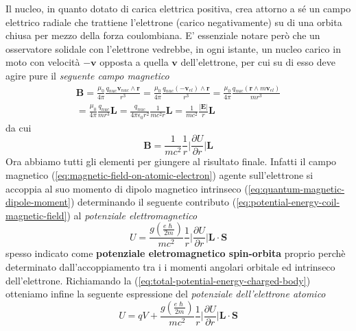 Il nucleo, in quanto dotato di carica elettrica positiva, crea attorno a sé un campo elettrico radiale che trattiene l’elettrone (carico negativamente) su di una orbita chiusa per mezzo della forza coulombiana.
E’ essenziale notare però che un osservatore solidale con l’elettrone vedrebbe, in ogni istante,  un nucleo carico in moto con velocità $- \bm{v}$ opposta a quella $\bm{v}$ dell’elettrone, per cui su di esso deve agire pure il \emph{seguente campo magnetico}
\begin{gather*}
\bm{B} = \frac{\mu_{0}}{4 \pi} \frac{q_{nuc} \bm{v}_{nuc} \wedge \bm{r}}{r^{3}} = \frac{\mu_{0}}{4 \pi} \frac{q_{nuc} (-\bm{v}_{el}) \wedge \bm{r}}{r^{3}} = \frac{\mu_{0}}{4 \pi} \frac{q_{nuc} (\bm{r} \wedge m\bm{v}_{el})}{mr^{3}} \\
= \frac{\mu_{0}}{4 \pi} \frac{q_{nuc}}{m r^{3}} \bm{L}  = \frac{q_{nuc}}{4 \pi \epsilon_{0}r^{2}} \frac{1}{mc^{2}r} \bm{L} = \frac{1}{mc^{2}}  \frac{|\bm{E}|}{r} \bm{L}
\end{gather*}
da cui
\begin{equation}
	\bm{B} = \frac{1}{mc^{2}} \frac{1}{r} \bigg|\frac{ \partial U }{ \partial r }  \bigg| \bm{L}
	\label{eq:magnetic-field-on-atomic-electron}
\end{equation}
Ora abbiamo tutti gli elementi per giungere al risultato finale.
Infatti il campo magnetico (\ref{eq:magnetic-field-on-atomic-electron}) agente sull’elettrone si accoppia al suo momento di dipolo magnetico intrinseco (\ref{eq:quantum-magnetic-dipole-moment}) determinando il seguente contributo (\ref{eq:potential-energy-coil-magnetic-field}) al \emph{potenziale elettromagnetico}
\begin{equation}
	U = \frac{g \left( \frac{e\hslash}{2m} \right)}{m c^{2}} \frac{1}{r} \bigg| \frac{ \partial U }{ \partial r }  \bigg| \bm{L} \cdot \bm{S}
	\label{eq:spin-orbit-em-potential}
\end{equation}
spesso indicato come \textbf{potenziale eletromagnetico spin-orbita} proprio perchè determinato dall’accoppiamento tra i i momenti angolari orbitale ed intrinseco dell’elettrone.
Richiamando la (\ref{eq:total-potential-energy-charged-body}) otteniamo infine la seguente espressione del \emph{potenziale dell’elettrone atomico}
\begin{equation}
	U = qV + \frac{g \left( \frac{e\hslash}{2m} \right)}{m c^{2}} \frac{1}{r} \bigg| \frac{ \partial U }{ \partial r }  \bigg| \bm{L} \cdot \bm{S}
	\label{eq:total-em-potential-spin-orbit}
\end{equation}
